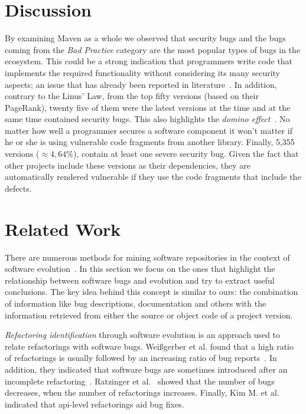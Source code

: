 \documentclass[conference]{llncs}
\begin{document}
\section{Discussion}
\label{sec:dis}

By examining Maven as a whole we observed that security bugs and the
bugs coming from the {\it Bad Practice} category are the most popular types of
bugs in the ecosystem. This could be a strong indication that programmers write code
that implements the required functionality without considering its many
security aspects; an issue that has already been reported in
literature~\cite{SH09}. In addition, contrary to the Linus' Law, from the top fifty versions
(based on their PageRank), twenty five of them were the latest versions at the
time and at the same time contained security bugs.
This also highlights the {\it domino effect}~\cite{TH04}. No matter how well a programmer
secures a software component it won't matter if he or she is using vulnerable
code fragments from another library. Finally, 5,355 versions ($\approx 4,64\% $), contain at
least one severe security bug. Given the fact that other projects include these
versions as their dependencies, they are automatically rendered vulnerable if
they use the code fragments that include the defects.

\section{Related Work}
\label{sec:rel}

There are numerous methods for mining software repositories in the context
of software evolution~\cite{KCM07}. In this section we focus on the ones
that highlight the relationship between software bugs and evolution and try to
extract useful conclusions. The key idea behind this concept is
similar to ours: the combination of information like bug descriptions,
documentation and others with the information retrieved from either the source
or object code of a project version.

{\it Refactoring identification} through software evolution is an approach used to
relate refactorings with software bugs. Wei{\ss}gerber et al. found that a high
ratio of refactorings is usually followed by an increasing ratio of bug
reports~\cite{WD06}. In addition, they indicated that software bugs are sometimes introduced
after an incomplete refactoring~\cite{GW05}.
Ratzinger et al.~\cite{RSG08} showed that the number of bugs decreases, when the number of
refactorings increases. Finally, Kim M. et al.~\cite{KCK11} indicated that {\sc api}-level
refactorings aid bug fixes.
\end{document}
